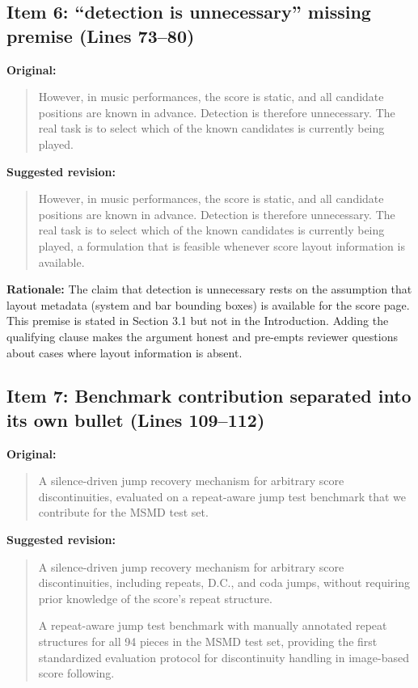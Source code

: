 \documentclass{article}
\begin{document}
\subsection*{Item 6: ``detection is unnecessary'' missing premise (Lines 73--80)}

\textbf{Original:}
\begin{quote}
However, in music performances, the score is static, and all candidate positions are known in advance. Detection is therefore unnecessary. The real task is to select which of the known candidates is currently being played.
\end{quote}

\textbf{Suggested revision:}
\begin{quote}
However, in music performances, the score is static, and all candidate positions are known in advance. Detection is therefore unnecessary. The real task is to select which of the known candidates is currently being played, a formulation that is feasible whenever score layout information is available.
\end{quote}

\textbf{Rationale:}
The claim that detection is unnecessary rests on the assumption that layout metadata (system and bar bounding boxes) is available for the score page. This premise is stated in Section 3.1 but not in the Introduction. Adding the qualifying clause makes the argument honest and pre-empts reviewer questions about cases where layout information is absent.

\subsection*{Item 7: Benchmark contribution separated into its own bullet (Lines 109--112)}

\textbf{Original:}
\begin{quote}
A silence-driven jump recovery mechanism for arbitrary score discontinuities, evaluated on a repeat-aware jump test benchmark that we contribute for the MSMD test set.
\end{quote}

\textbf{Suggested revision:}
\begin{quote}
A silence-driven jump recovery mechanism for arbitrary score discontinuities, including repeats, D.C., and coda jumps, without requiring prior knowledge of the score's repeat structure.

A repeat-aware jump test benchmark with manually annotated repeat structures for all 94 pieces in the MSMD test set, providing the first standardized evaluation protocol for discontinuity handling in image-based score following.
\end{quote}
\end{document}
